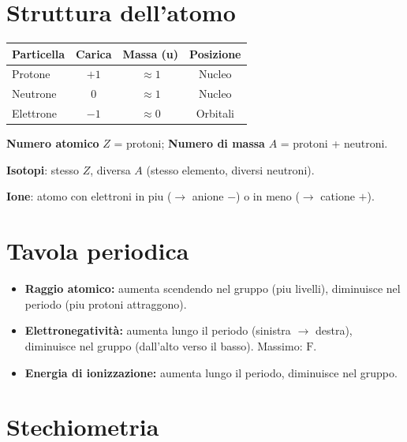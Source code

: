 \documentclass[12pt, a4paper, twoside, openright]{book}
\theoremstyle{definition}
\begin{document}
\section{Struttura dell'atomo}

\begin{defbox}
\begin{center}
\begin{tabular}{lccc}
\toprule
\textbf{Particella} & \textbf{Carica} & \textbf{Massa (u)} & \textbf{Posizione} \\
\midrule
Protone & $+1$ & $\approx 1$ & Nucleo \\
Neutrone & $0$ & $\approx 1$ & Nucleo \\
Elettrone & $-1$ & $\approx 0$ & Orbitali \\
\bottomrule
\end{tabular}
\end{center}
\textbf{Numero atomico} $Z$ = protoni; \textbf{Numero di massa} $A$ = protoni + neutroni.
\end{defbox}

\begin{attenzione}
\textbf{Isotopi}: stesso $Z$, diversa $A$ (stesso elemento, diversi neutroni).

\textbf{Ione}: atomo con elettroni in piu ($\to$ anione $-$) o in meno ($\to$ catione $+$).
\end{attenzione}

\section{Tavola periodica}

\begin{attenzione}
\begin{itemize}
  \item \textbf{Raggio atomico:} aumenta scendendo nel gruppo (piu livelli), diminuisce nel periodo (piu protoni attraggono).
  \item \textbf{Elettronegatività:} aumenta lungo il periodo (sinistra $\to$ destra), diminuisce nel gruppo (dall'alto verso il basso). Massimo: $\mathrm{F}$.
  \item \textbf{Energia di ionizzazione:} aumenta lungo il periodo, diminuisce nel gruppo.
\end{itemize}
\end{attenzione}

\section{Stechiometria}
\end{document}

